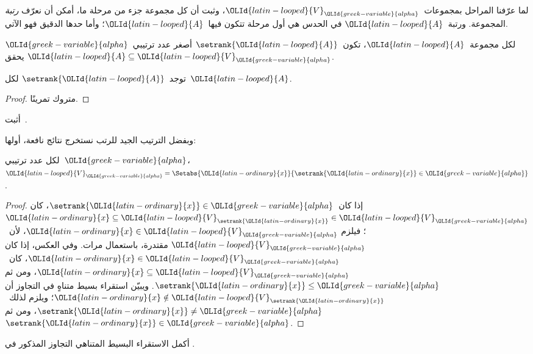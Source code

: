 \documentclass[../../../include/open-logic-section]{subfiles}
\begin{document}

لما عرّفنا المراحل بمجموعات~$\OLId{latin-looped}{V}_\OLId{greek-variable}{alpha}$، وثبت أن كل مجموعة جزء من
مرحلة ما، أمكن أن نعرّف \emph{رتبة} المجموعة. ورتبة~$\OLId{latin-looped}{A}$ في الحدس
هي أول مرحلة تتكون فيها~$\OLId{latin-looped}{A}$؛ وأما حدها الدقيق فهو الآتي.

\begin{defn}
لكل مجموعة~$\OLId{latin-looped}{A}$، تكون~$\setrank{\OLId{latin-looped}{A}}$ أصغر عدد ترتيبي~$\OLId{greek-variable}{alpha}$ يحقق
$\OLId{latin-looped}{A} \subseteq \OLId{latin-looped}{V}_\OLId{greek-variable}{alpha}$.
\end{defn}
\begin{prop}
	توجد~$\setrank{\OLId{latin-looped}{A}}$ لكل~$\OLId{latin-looped}{A}$.
\end{prop}
\begin{proof}
	متروك تمرينًا.
\end{proof}
\begin{prob}
	أثبت~.
\end{prob}
\noindent
وبفضل الترتيب الجيد للرتب نستخرج نتائج نافعة، أولها:
\begin{prop}
لكل عدد ترتيبي~$\OLId{greek-variable}{alpha}$،
$\OLId{latin-looped}{V}_\OLId{greek-variable}{alpha} = \Setabs{\OLId{latin-ordinary}{x}}{\setrank{\OLId{latin-ordinary}{x}} \in \OLId{greek-variable}{alpha}}$.
\end{prop}

\begin{proof}
إذا كان~$\setrank{\OLId{latin-ordinary}{x}} \in \OLId{greek-variable}{alpha}$، كان
$\OLId{latin-ordinary}{x} \subseteq \OLId{latin-looped}{V}_{\setrank{\OLId{latin-ordinary}{x}}} \in \OLId{latin-looped}{V}_\OLId{greek-variable}{alpha}$؛ فيلزم
$\OLId{latin-ordinary}{x} \in \OLId{latin-looped}{V}_\OLId{greek-variable}{alpha}$، لأن~$\OLId{latin-looped}{V}_\OLId{greek-variable}{alpha}$ مقتدرة، باستعمال
 مرات. وفي العكس، إذا كان
$\OLId{latin-ordinary}{x} \in \OLId{latin-looped}{V}_\OLId{greek-variable}{alpha}$، كان~$\OLId{latin-ordinary}{x} \subseteq \OLId{latin-looped}{V}_\OLId{greek-variable}{alpha}$، ومن ثم
$\setrank{\OLId{latin-ordinary}{x}} \leq \OLId{greek-variable}{alpha}$. ويبيّن استقراء بسيط متناهٍ في التجاوز أن
$\OLId{latin-ordinary}{x} \notin \OLId{latin-looped}{V}_{\setrank{\OLId{latin-ordinary}{x}}}$؛ ويلزم لذلك~$\setrank{\OLId{latin-ordinary}{x}} \neq \OLId{greek-variable}{alpha}$،
ومن ثم~$\setrank{\OLId{latin-ordinary}{x}} \in \OLId{greek-variable}{alpha}$.
\end{proof}
\begin{prob}
	أكمل الاستقراء البسيط المتناهي التجاوز المذكور في
	.
\end{prob}
\end{document}

